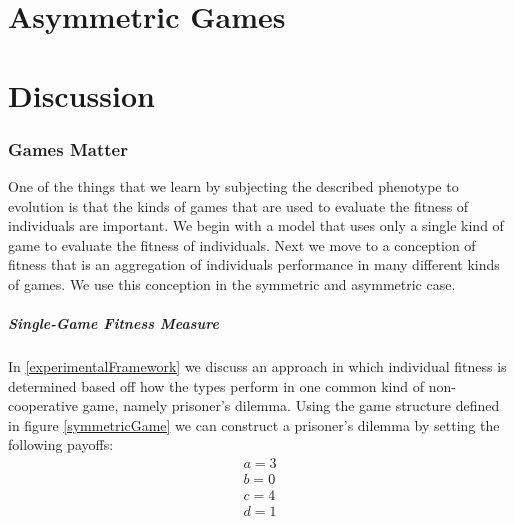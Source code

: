 \documentclass[11pt]{book}
\newcommand*{\np}{\par\noindent\newline}
\begin{document}
\chapter{Asymmetric Games}\label{asymmetricGames}
\chapter{Discussion}\label{discussion}


\subsection{Games Matter}

One of the things that we learn by subjecting the described phenotype to evolution is that the kinds of games that are used to evaluate the fitness of individuals are important.
We begin with a model that uses only a single kind of game to evaluate the fitness of individuals.
Next we move to a conception of fitness that is an aggregation of individuals performance in many different kinds of games.
We use this conception in the symmetric and asymmetric case.

\paragraph{Single-Game Fitness Measure}
\np In \ref{experimentalFramework} we discuss an approach in which individual fitness is determined based off  how the types perform in one common kind of non-cooperative game, namely prisoner's dilemma.
Using the game structure defined in figure \ref{symmetricGame} we can construct a prisoner's dilemma by setting the following payoffs:
\begin{gather*}
	a = 3\\
	b = 0\\
	c = 4\\
	d = 1
\end{gather*}
\end{document}
